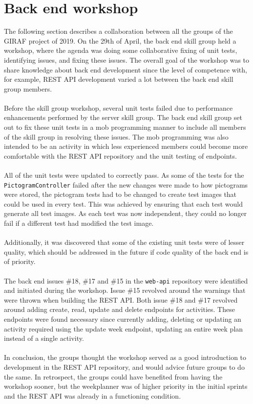 \section{Back end workshop}
The following section describes a collaboration between all the groups of the GIRAF project of 2019. 
On the 29th of April, the back end skill group held a workshop, where the agenda was doing some collaborative fixing of unit tests, identifying issues, and fixing these issues. 
The overall goal of the workshop was to share knowledge about back end development since the level of competence with, for example, REST API development varied a lot between the back end skill group members.
\\\\
Before the skill group workshop, several unit tests failed due to performance enhancements performed by the server skill group.
The back end skill group set out to fix these unit tests in a mob programming manner to include all members of the skill group in resolving these issues.
The mob programming was also intended to be an activity in which less experienced members could become more comfortable with the REST API repository and the unit testing of endpoints.
\\\\
All of the unit tests were updated to correctly pass.
As some of the tests for the \texttt{PictogramController} failed after the new changes were made to how pictograms were stored, the pictogram tests had to be changed to create test images that could be used in every test.
This was achieved by ensuring that each test would generate all test images.
As each test was now independent, they could no longer fail if a different test had modified the test image.
\\\\
Additionally, it was discovered that some of the existing unit tests were of lesser quality, which should be addressed in the future if code quality of the back end is of priority.
\\\\
The back end issues \#18, \#17 and \#15 in the \texttt{web-api} repository were identified and initiated during the workshop.
Issue \#15 revolved around the warnings that were thrown when building the REST API.
Both issue \#18 and \#17 revolved around adding create, read, update and delete endpoints for activities.
These endpoints were found necessary since currently adding, deleting or updating an activity required using the update week endpoint, updating an entire week plan instead of a single activity. 
\\\\
In conclusion, the groups thought the workshop served as a good introduction to development in the REST API repository, and would advice future groups to do the same.
In retrospect, the groups could have benefited from having the workshop sooner, but the weekplanner was of higher priority in the initial sprints and the REST API was already in a functioning condition.
